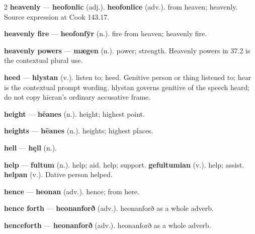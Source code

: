 \begin{multicols}{2}
\textbf{heavenly} — \textbf{heofonlic} (adj.).  \textbf{heofonlice} (adv.). from heaven; heavenly. Source expression at Cook 143.17.\par
\textbf{heavenly fire} — \textbf{heofonfȳr} (n.). fire from heaven; heavenly fire.\par
\textbf{heavenly powers} — \textbf{mægen} (n.). power; strength. Heavenly powers in 37.2 is the contextual plural use.\par
\textbf{heed} — \textbf{hlystan} (v.). listen to; heed. Genitive person or thing listened to; hear is the contextual prompt wording. hlystan governs genitive of the speech heard; do not copy hīeran's ordinary accusative frame.\par
\textbf{height} — \textbf{hēanes} (n.). height; highest point.\par
\textbf{heights} — \textbf{hēanes} (n.). heights; highest places.\par
\textbf{hell} — \textbf{hęll} (n.).\par
\textbf{help} — \textbf{fultum} (n.). help; aid. help; support. \textbf{gefultumian} (v.). help; assist. \textbf{helpan} (v.). Dative person helped.\par
\textbf{hence} — \textbf{heonan} (adv.). hence; from here.\par
\textbf{hence forth} — \textbf{heonanforð} (adv.). heonanforð as a whole adverb.\par
\textbf{henceforth} — \textbf{heonanforð} (adv.). heonanforð as a whole adverb.\par

\end{multicols}
